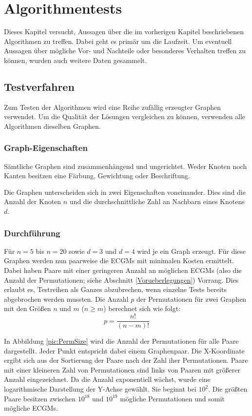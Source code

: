 \chapter{Algorithmentests}\label{chp:AlgoTest}

Dieses Kapitel versucht, Aussagen über die im vorherigen Kapitel beschriebenen 
Algorithmen zu treffen. Dabei geht es primär um die Laufzeit. Um eventuell Aussagen über 
mögliche Vor- und Nachteile oder besonderes Verhalten treffen zu können, wurden auch 
weitere Daten gesammelt. 

\section{Testverfahren}
Zum Testen der Algorithmen wird eine Reihe zufällig erzeugter Graphen verwendet. Um die 
Qualität der Lösungen vergleichen zu können, verwenden alle Algorithmen dieselben Graphen. 

\subsection{Graph-Eigenschaften}\label{GraphEigenschaften}
Sämtliche Graphen sind zusammenhängend und ungerichtet. Weder Knoten noch Kanten 
besitzen eine Färbung, Gewichtung oder Beschriftung. 

Die Graphen unterscheiden sich in zwei Eigenschaften voneinander. Dies sind die Anzahl 
der Knoten $n$ und die durchschnittliche Zahl an Nachbarn eines Knotens $d$. 

\subsection{Durchführung}
Für $n=5$ bis $n=20$ sowie $d=3$ und $d=4$ wird je ein Graph erzeugt. Für 
diese Graphen werden nun paarweise die ECGMs mit minimalen Kosten ermittelt. 
Dabei haben Paare mit einer geringeren Anzahl an möglichen ECGMs (also die 
Anzahl der Permutationen; siehe Abschnitt \ref{Vorueberlegungen}) Vorrang. Dies erlaubt es, Testreihen als Ganzes 
abzubrechen, wenn einzelne Tests bereits abgebrochen werden mussten. Die 
Anzahl $p$ der Permutationen für zwei Graphen mit den Größen $n$ und $m$ 
($n \geq m$) berechnet sich wie folgt: 
\[ p=\frac{n!}{(n-m)!} \]

In Abbildung \ref{pic:PermSize} wird die Anzahl der Permutationen für alle Paare 
dargestellt. Jeder Punkt entspricht dabei einem Graphenpaar. Die X-Koordinate 
ergibt sich aus der Sortierung der Paare nach der Zahl iher Permutationen. Paare 
mit einer kleineren Zahl von Permutationen sind links von Paaren mit größerer Anzahl 
eingezeichnet.
Da die Anzahl exponentiell wächst, wurde eine logarithmische Darstellung der Y-Achse 
gewählt. Sie beginnt bei $10^2$. Die größten Paare besitzen zwischen $10^{18}$ und 
$10^{19}$ mögliche Permutationen und somit mögliche ECGMs. 

